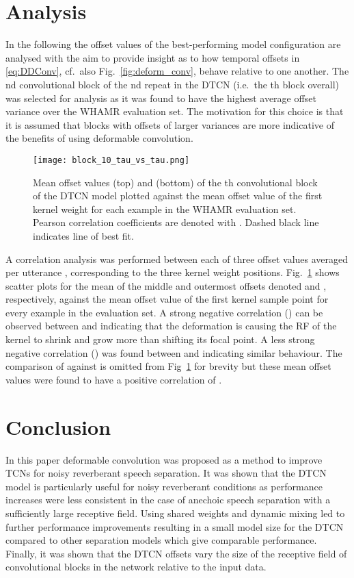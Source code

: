 \documentclass{article}
\begin{document}
\section{Analysis}\label{sec:discussion}
In the following the offset values of the best-performing model configuration  are analysed with the aim to provide insight as to how temporal offsets  in \eqref{eq:DDConv}, cf.~also Fig.~\ref{fig:deform_conv}, behave relative to one another. 
The nd convolutional block of the nd repeat in the \ac{DTCN} (i.e.~the th block overall) was selected for analysis as it was found to have the highest average offset variance over the WHAMR evaluation set. The motivation for this choice is that it is assumed that blocks with offsets of larger variances are more indicative of the benefits of using deformable convolution.
\begin{figure}[!ht]
    \centering
\texttt{[image: block\_10\_tau\_vs\_tau.png]}
\caption{Mean offset values  (top) and  (bottom) of the th convolutional block of the \ac{DTCN} model plotted against the mean offset value of the first kernel weight  for each example in the WHAMR evaluation set. Pearson correlation coefficients are denoted with . Dashed black line indicates line of best fit.}
    \label{fig:tauvstau}
\end{figure}
A correlation analysis was performed between each of three offset values averaged per utterance , corresponding to the three kernel weight positions. Fig.~\ref{fig:tauvstau} shows scatter plots for the mean of the middle and outermost offsets denoted  and , respectively, against the mean offset value of the first kernel sample point  for every example in the evaluation set. A strong negative correlation () can be observed between  and  indicating that the deformation is causing the \ac{RF} of the kernel to shrink and grow more than shifting its focal point. A less strong negative correlation () was found between  and  indicating similar behaviour. The comparison of  against  is omitted from Fig~\ref{fig:tauvstau} for brevity but these mean offset values were found to have a positive correlation of .

\section{Conclusion}\label{sec:conclusion}
In this paper deformable convolution was proposed as a method to improve \acp{TCN} for noisy reverberant speech separation. It was shown that the \ac{DTCN} model is particularly useful for noisy reverberant conditions as performance increases were less consistent in the case of anechoic speech separation with a sufficiently large receptive field. 
Using shared weights and dynamic mixing led to further performance improvements resulting in a small model size for the \ac{DTCN} compared to other separation models which give comparable performance. 
Finally, it was shown that the \ac{DTCN} offsets vary the size of the receptive field of convolutional blocks in the network relative to the input data.


 

\end{document}
